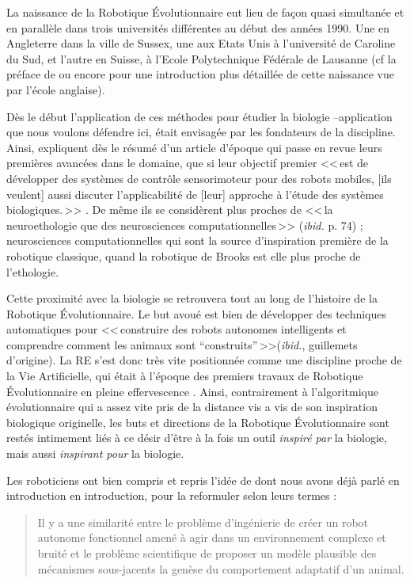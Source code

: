 La naissance de la Robotique \'Evolutionnaire eut lieu de façon quasi simultanée et en parallèle dans trois universités différentes au début des années 1990. Une en Angleterre dans la ville de Sussex, une aux Etats Unis à l'université de Caroline du Sud, et l'autre en Suisse, à l'Ecole Polytechnique Fédérale de Lausanne (cf la préface de \cite{nolfi00evolrobobiolintetechselfmach} ou encore \citet{harvey97evolutionaryroboticssussexapproach} pour une introduction plus détaillée de cette naissance vue par l'école anglaise).

Dès le début l'application de ces méthodes pour étudier la biologie --application que nous voulons défendre ici, était envisagée par les fondateurs de la discipline. Ainsi, \cite{cliff93explorationsinevolutionaryrobotics} expliquent dès le résumé d'un article d'époque qui passe en revue leurs premières avancées dans le domaine, que si leur objectif premier <<\,est de développer des systèmes de contrôle sensorimoteur pour des robots mobiles, [ils veulent] aussi discuter l'applicabilité de [leur] approche à l'étude des systèmes biologiques.\,>> \citep[p. 73]{cliff93explorationsinevolutionaryrobotics}. De même ils se considèrent plus proches de <<\,la neuroethologie que des neurosciences computationnelles\,>> (\emph{ibid.} p. 74) ; neurosciences computationnelles qui sont la source d'inspiration première de la robotique classique, quand la robotique de Brooks est elle plus proche de l'ethologie.

Cette proximité avec la biologie se retrouvera tout au long de l'histoire de la Robotique \'Evolutionnaire. Le but avoué est bien de développer des techniques automatiques pour <<\,construire des robots autonomes intelligents et comprendre comment les animaux sont ``construits''\,>>(\emph{ibid.}, guillemets d'origine). La RE s'est donc très vite positionnée comme une discipline proche de la Vie Artificielle, qui était à l'époque des premiers travaux de Robotique \'Evolutionnaire en pleine effervescence \citep{langton89alifeiproceedingsfirstinternationalworkshopsynthesissimulationlivingsystems}. Ainsi, contrairement à l'algoritmique évolutionnaire qui a assez vite pris de la distance vis a vis de son inspiration biologique originelle, les buts et directions de la Robotique \'Evolutionnaire sont restés intimement liés à ce désir d'être à la fois un outil \emph{inspiré par} la biologie, mais aussi \emph{inspirant pour} la biologie.

Les roboticiens ont bien compris et repris l'idée de \cite{maynardsmith78optimizationtheoryinevolution} dont nous avons déjà parlé en introduction en introduction, pour la reformuler selon leurs termes :
\begin{quotation}
   Il y a une similarité entre le problème d'ingénierie de créer un robot autonome fonctionnel amené à agir dans un environnement complexe et bruité et le problème scientifique de proposer un modèle plausible des mécanismes sous-jacents la genèse du comportement adaptatif d'un animal.\\
   \citep[p. 74]{cliff93explorationsinevolutionaryrobotics}
\end{quotation}

